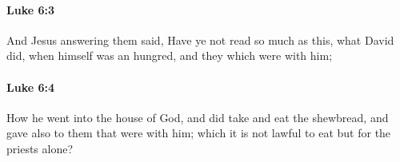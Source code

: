 		\paragraph{Luke 6:3} %
			\label{LUKE-6-3}

			And Jesus answering them said, Have ye not read so much as this, what David did, when himself was an hungred, and they which were with him;

			\begin{framed}
			\scriptsize
				\begin{compactdesc}
					\item[SBLG] 
				\end{compactdesc}
			\end{framed}

		\paragraph{Luke 6:4} %
			\label{LUKE-6-4}

			How he went into the house of God, and did take and eat the shewbread, and gave also to them that were with him; which it is not lawful to eat but for the priests alone?

